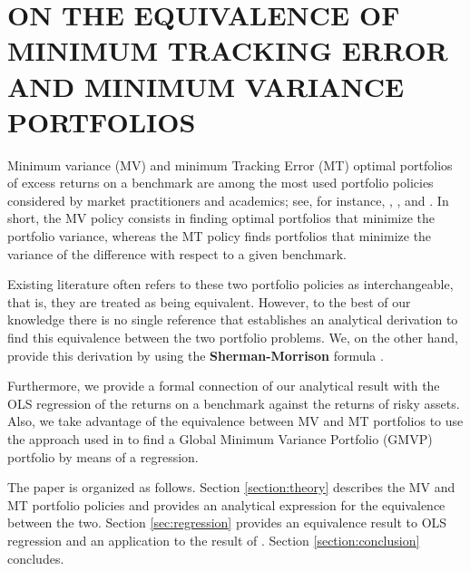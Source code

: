 \documentclass[12pt,oneside,a4paper]{memoir}
\begin{document}
\chapter{ON THE EQUIVALENCE OF MINIMUM TRACKING ERROR AND MINIMUM VARIANCE PORTFOLIOS}


Minimum variance (MV) and minimum Tracking Error (MT) optimal portfolios of excess returns on a benchmark are among the most used portfolio policies considered by market practitioners and academics; see, for instance, , ,  and .
In short, the MV policy consists in finding optimal portfolios that minimize the portfolio variance, whereas the MT policy finds portfolios that minimize the variance of the difference with respect to a given benchmark.

Existing literature often refers to these two portfolio policies as interchangeable, that is, they are treated as being equivalent.
However, to the best of our knowledge there is no single reference that establishes an analytical derivation to find this equivalence between the two portfolio problems.
We, on the other hand, provide this derivation by using the \textbf{Sherman-Morrison} formula \cite{matcook2012}.

Furthermore, we provide a formal connection of our analytical result with the OLS regression of the returns on a benchmark against the returns of risky assets.
Also, we take advantage of the equivalence between MV and MT portfolios to use the approach used in  to find a Global Minimum Variance Portfolio (GMVP) portfolio by means of a regression.



The paper is organized as follows.
Section \ref{section:theory} describes the MV and MT portfolio policies and provides an analytical expression for the equivalence between the two.
Section \ref{sec:regression} provides an equivalence result to OLS regression and an application to the result of .
Section \ref{section:conclusion} concludes.
\end{document}
